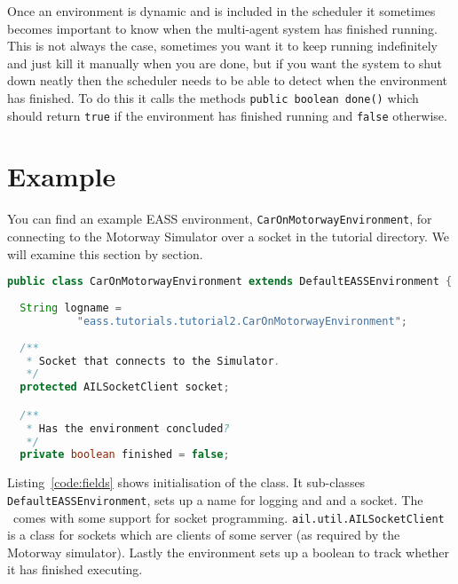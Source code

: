 \documentclass[a4]{article}
\begin{document}
Once an environment is dynamic and is included in the scheduler it sometimes becomes important to know when the multi-agent system has finished running.  This is not always the case, sometimes you want it to keep running indefinitely and just kill it manually when you are done, but if you want the system to shut down neatly then the scheduler needs to be able to detect when the environment has finished.  To do this it calls the methods \texttt{public boolean done()} which should return \texttt{true} if the environment has finished running and \texttt{false} otherwise.

\section{Example}
You can find an example EASS environment, \texttt{CarOnMotorwayEnvironment}, for connecting to the Motorway Simulator over a socket in the tutorial directory.  We will examine this section by section.

\begin{lstlisting}[float,caption=Class Fields,basicstyle=\sffamily,language=Java,label=code:fields,style=easslisting]
public class CarOnMotorwayEnvironment extends DefaultEASSEnvironment {
  
  String logname = 
           "eass.tutorials.tutorial2.CarOnMotorwayEnvironment";
		
  /**
   * Socket that connects to the Simulator.
   */
  protected AILSocketClient socket;

  /**
   * Has the environment concluded?
   */
  private boolean finished = false;
\end{lstlisting}
Listing~\ref{code:fields} shows initialisation of the class.  It sub-classes \texttt{DefaultEASSEnvironment}, sets up a name for logging and and a socket.  The \ail\ comes with some support for socket programming.  \texttt{ail.util.AILSocketClient} is a class for sockets which are clients of some server (as required by the Motorway simulator).  Lastly the environment sets up a boolean to track whether it has finished executing.
\end{document}
